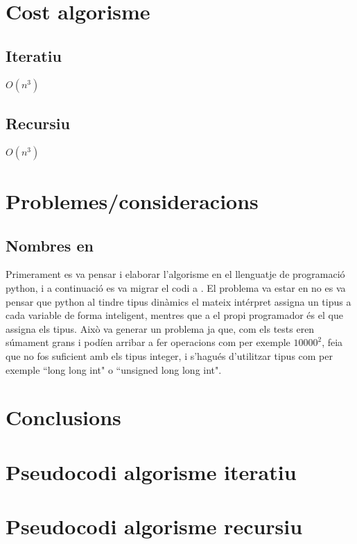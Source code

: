 \documentclass[12pt, letterpaper]{article}
\begin{document}
\section{Cost algorisme}
\subsection{Iteratiu}
$O(n^{3})$ 
\subsection{Recursiu}
$O(n^{3})$ 
    
\section{Problemes/consideracions}
\subsection{Nombres en \cpluspluslogo}
Primerament es va pensar i elaborar l'algorisme en el llenguatje de programació python, i a continuació es va migrar el codi a \cpluspluslogo. El problema va estar en no es va pensar que python al tindre tipus dinàmics el mateix intérpret assigna un tipus a cada variable de forma inteligent, mentres que a \cpluspluslogo el propi programador és el que assigna els tipus. Això va generar un problema ja que, com els tests eren súmament grans i podíen arribar a fer operacions com per exemple $10000^{2}$, feia que no fos suficient amb els tipus integer, i s'hagués d'utilitzar tipus com per exemple ``long long int" o ``unsigned long long int".

\section{Conclusions}

\appendix
\section{Pseudocodi algorisme iteratiu}
\label{pseudocodiiteratiu}

\section{Pseudocodi algorisme recursiu}
\label{pseudocodirecursiu}
\end{document}
